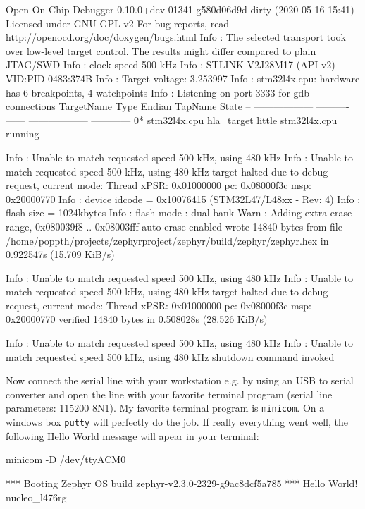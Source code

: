 \begin{textbox}
Open On-Chip Debugger 0.10.0+dev-01341-g580d06d9d-dirty (2020-05-16-15:41)
Licensed under GNU GPL v2
For bug reports, read
	http://openocd.org/doc/doxygen/bugs.html
Info : The selected transport took over low-level target control. The results might differ compared to plain JTAG/SWD
Info : clock speed 500 kHz
Info : STLINK V2J28M17 (API v2) VID:PID 0483:374B
Info : Target voltage: 3.253997
Info : stm32l4x.cpu: hardware has 6 breakpoints, 4 watchpoints
Info : Listening on port 3333 for gdb connections
    TargetName         Type       Endian TapName            State       
--  ------------------ ---------- ------ ------------------ ------------
 0* stm32l4x.cpu       hla_target little stm32l4x.cpu       running

Info : Unable to match requested speed 500 kHz, using 480 kHz
Info : Unable to match requested speed 500 kHz, using 480 kHz
target halted due to debug-request, current mode: Thread 
xPSR: 0x01000000 pc: 0x08000f3c msp: 0x20000770
Info : device idcode = 0x10076415 (STM32L47/L48xx - Rev: 4)
Info : flash size = 1024kbytes
Info : flash mode : dual-bank
Warn : Adding extra erase range, 0x080039f8 .. 0x08003fff
auto erase enabled
wrote 14840 bytes from file /home/poppth/projects/zephyrproject/zephyr/build/zephyr/zephyr.hex in 0.922547s (15.709 KiB/s)

Info : Unable to match requested speed 500 kHz, using 480 kHz
Info : Unable to match requested speed 500 kHz, using 480 kHz
target halted due to debug-request, current mode: Thread 
xPSR: 0x01000000 pc: 0x08000f3c msp: 0x20000770
verified 14840 bytes in 0.508028s (28.526 KiB/s)

Info : Unable to match requested speed 500 kHz, using 480 kHz
Info : Unable to match requested speed 500 kHz, using 480 kHz
shutdown command invoked
\end{textbox}

Now connect the serial line with your workstation e.g. by using an USB to serial converter and open the line with your favorite terminal program (serial line parameters: 115200 8N1). My favorite terminal program is \texttt{minicom}. On a windows box \texttt{putty} will perfectly do the job. If really everything went well, the following Hello World message will apear in your terminal:
\begin{bashbox}
minicom -D /dev/ttyACM0
\end{bashbox}


\begin{textbox}
*** Booting Zephyr OS build zephyr-v2.3.0-2329-g9ac8dcf5a785  ***
Hello World! nucleo_l476rg
\end{textbox}
